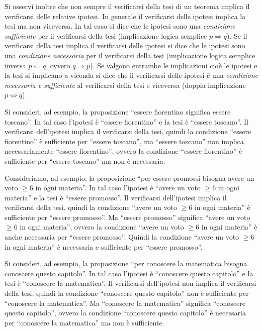 Si osservi inoltre che non sempre il verificarsi della tesi di un teorema implica il verificarsi delle relative ipotesi. In generale il verificarsi delle ipotesi implica la tesi ma non viceversa. In tal caso si dice che le ipotesi sono una \emph{condizione sufficiente} per il verificarsi della tesi (implicazione logica semplice $p \Rightarrow q$). Se il verificarsi della tesi implica il verificarsi delle ipotesi si dice che le ipotesi sono una \emph{condizione necessaria} per il verificarsi della tesi (implicazione logica semplice inversa $p \Leftarrow q$, ovvero $q \Rightarrow p$). Se valgono entrambe le implicazioni cioè le ipotesi e la tesi si implicano a vicenda si dice che il verificarsi delle ipotesi è una \emph{condizione necessaria e sufficiente} al verificarsi della tesi e viceversa (doppia implicazione $p \Leftrightarrow q$).

Si consideri, ad esempio, la proposizione ``essere fiorentino significa essere toscano''.
In tal caso l'ipotesi è ``essere fiorentino'' e la tesi è ``essere toscano''. Il verificarsi dell'ipotesi implica il verificarsi della tesi, quindi la condizione ``essere fiorentino'' è sufficiente per ``essere toscano'', ma ``essere toscano'' non implica necessariamente ``essere fiorentino'', ovvero la condizione ``essere fiorentino'' è sufficiente per ``essere toscano'' ma non è necessaria.

Consideriamo, ad esempio, la proposizione ``per essere promossi bisogna avere un voto $\geq 6$ in ogni materia''.
In tal caso l'ipotesi è ``avere un voto $\geq 6$ in ogni materia'' e la tesi è ``essere promosso''. Il verificarsi dell'ipotesi implica il verificarsi della tesi, quindi la condizione ``avere un voto $\geq 6$ in ogni materia'' è sufficiente per ``essere promosso''. Ma ``essere promosso'' significa ``avere un voto $\geq 6$ in ogni materia'', ovvero la condizione ``avere un voto $\geq 6$ in ogni materia'' è anche necessaria per ``essere promosso''. Quindi la condizione ``avere un voto $\geq 6$ in ogni materia'' è necessaria e sufficiente per ``essere promosso''.

Si consideri, ad esempio, la proposizione ``per conoscere la matematica bisogna conoscere questo capitolo''.
In tal caso l'ipotesi è ``conoscere questo capitolo'' e la tesi è ``conoscere la matematica''. Il verificarsi dell'ipotesi non implica il verificarsi della tesi, quindi la condizione ``conoscere questo capitolo'' non è sufficiente per ``conoscere la matematica''. Ma ``conoscere la matematica'' significa ``conoscere questo capitolo'', ovvero la condizione ``conoscere questo capitolo'' è necessaria per ``conoscere la matematica'' ma non è sufficiente.

